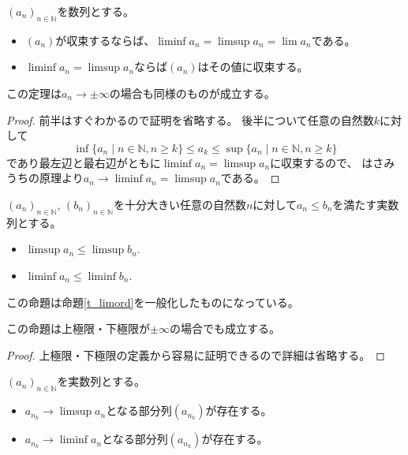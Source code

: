 \begin{proposition}
$(a_n)_{n \in \mathbb{N}}$を数列とする。
\begin{itemize}
\item
$(a_n)$が収束するならば、$\liminf a_n = \limsup a_n = \lim a_n$である。
\item
$\liminf a_n = \limsup a_n$ならば$(a_n)$はその値に収束する。
\end{itemize}
\end{proposition}

\begin{remark}
この定理は$a_n \to \pm \infty$の場合も同様のものが成立する。
\end{remark}

\begin{proof}
前半はすぐわかるので証明を省略する。
後半について任意の自然数$k$に対して
$$
\inf\{ a_n \mid n \in \mathbb{N}, n \ge k \} \le a_k \le \sup\{ a_n \mid n \in \mathbb{N}, n \ge k \}
$$
であり最左辺と最右辺がともに$\liminf a_n = \limsup a_n$に収束するので、
はさみうちの原理より$a_n \to \liminf a_n = \limsup a_n$である。
\end{proof}

\begin{proposition}
\label{t_ord_slim}
$(a_n)_{n \in \mathbb{N}}$, $(b_n)_{n \in \mathbb{N}}$を十分大きい任意の自然数$n$に対して$a_n \le b_n$を満たす実数列とする。
\begin{itemize}
\item
$\limsup a_n \le \limsup b_n$.
\item
$\liminf a_n \le \liminf b_n$.
\end{itemize}
\end{proposition}

この命題は命題\ref{t_limord}を一般化したものになっている。

\begin{remark}
この命題は上極限・下極限が$\pm \infty$の場合でも成立する。
\end{remark}

\begin{proof}
上極限・下極限の定義から容易に証明できるので詳細は省略する。
\end{proof}

\begin{proposition}
\label{t_max_ulim}
$(a_n)_{n \in \mathbb{N}}$を実数列とする。
\begin{itemize}
\item
$a_{n_k} \to \limsup a_n$となる部分列$(a_{n_k})$が存在する。
\item
$a_{n_k} \to \liminf a_n$となる部分列$(a_{n_k})$が存在する。
\end{itemize}
\end{proposition}

